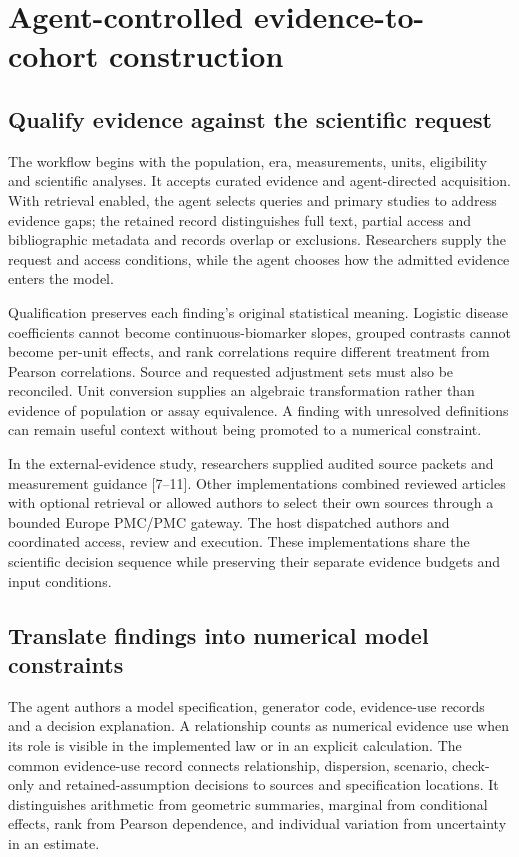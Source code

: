 \documentclass[sigconf,review]{acmart}
\begin{document}
\section{Agent-controlled evidence-to-cohort construction}

\subsection{Qualify evidence against the scientific request}

The workflow begins with the population, era, measurements, units, eligibility and scientific analyses. It accepts curated evidence and agent-directed acquisition. With retrieval enabled, the agent selects queries and primary studies to address evidence gaps; the retained record distinguishes full text, partial access and bibliographic metadata and records overlap or exclusions. Researchers supply the request and access conditions, while the agent chooses how the admitted evidence enters the model.


Qualification preserves each finding's original statistical meaning. Logistic disease coefficients cannot become continuous-biomarker slopes, grouped contrasts cannot become per-unit effects, and rank correlations require different treatment from Pearson correlations. Source and requested adjustment sets must also be reconciled. Unit conversion supplies an algebraic transformation rather than evidence of population or assay equivalence. A finding with unresolved definitions can remain useful context without being promoted to a numerical constraint.


In the external-evidence study, researchers supplied audited source packets and measurement guidance [7–\allowbreak{}11]. Other implementations combined reviewed articles with optional retrieval or allowed authors to select their own sources through a bounded Europe PMC/\allowbreak{}PMC gateway. The host dispatched authors and coordinated access, review and execution. These implementations share the scientific decision sequence while preserving their separate evidence budgets and input conditions.


\subsection{Translate findings into numerical model constraints}

The agent authors a model specification, generator code, evidence-use records and a decision explanation. A relationship counts as numerical evidence use when its role is visible in the implemented law or in an explicit calculation. The common evidence-use record connects relationship, dispersion, scenario, check-only and retained-assumption decisions to sources and specification locations. It distinguishes arithmetic from geometric summaries, marginal from conditional effects, rank from Pearson dependence, and individual variation from uncertainty in an estimate.
\end{document}
